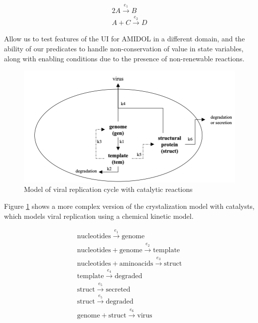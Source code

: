 \documentclass[11pt]{article}
\newcommand{\amidol}{\textsc{AMIDOL}}
\begin{document}
\begin{eqnarray}
  2A \overset{e_1}{\rightarrow} B\\
  A + C \overset{e_2}{\rightarrow} D
\end{eqnarray}

Allow us to test features of the UI for \amidol{} in a different domain, and the ability of our predicates to handle non-conservation of value in state variables, along with enabling conditions due to the presence of non-renewable reactions.

\begin{figure}
\includegraphics[width=\textwidth]{figs/ViralRep-Crop.png}
\caption{Model of viral replication cycle with catalytic reactions}
\label{Fig:ViralRep}
\end{figure}

Figure \ref{Fig:ViralRep} shows a more complex version of the crystalization model with catalysts, which models viral replication using a chemical kinetic model.

\begin{eqnarray}
\mathrm{nucleotides} \overset{e_1}{\rightarrow} \mathrm{genome}\\
\mathrm{nucleotides} + \mathrm{genome} \overset{e_2}{\rightarrow} \mathrm{template}\\
\mathrm{nucleotides} + \mathrm{aminoacids} \overset{e_3}{\rightarrow} \mathrm{struct}\\
\mathrm{template} \overset{e_4}{\rightarrow} \mathrm{degraded}\\
\mathrm{struct} \overset{e_5}{\rightarrow} \mathrm{secreted}\\
\mathrm{struct} \overset{e_5}{\rightarrow} \mathrm{degraded}\\
\mathrm{genome} + \mathrm{struct} \overset{e_6}{\rightarrow} \mathrm{virus}\\
\end{eqnarray}
\end{document}
